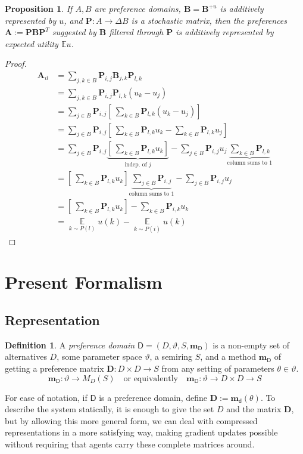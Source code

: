 \documentclass{article}
\theoremstyle{plain}
\newtheorem{prop}[theorem]{Proposition}
\theoremstyle{definition}
\newtheorem{defn}{Definition}[section]
\theoremstyle{remark}
\newcommand\mat[1]{\mathbf #1}
\newcommand\m[1]{\mathbf m_{\mathsf #1}}
\begin{document}
	\begin{prop}
		If $A, B$ are preference domains, $\mat B = \mat B^{+u}$ is additively represented by $u$, and $\mat P : A \to \Delta B$ is a stochastic matrix, then the preferences $\mat A := \mat P \mat B \mat P^T$ suggested by $\mat B$ filtered through $\mat P$ is additively represented by expected utility $\mathbb E u$.
	\end{prop}
	\begin{proof}
		\begin{align*}
			\mat A_{il} &= \sum_{j,k \in B} \mat P_{i,j} \mat B_{j,k} \mat P_{l,k} \\
				&= \sum_{j,k \in B} \mat P_{i,j}  \mat P_{l,k} (u_k - u_j) \\
				&= \sum_{j \in B} \mat P_{i,j} \left[ ~\sum_{k \in B} \mat P_{l,k} (u_k - u_j)\right]\\
				&= \sum_{j \in B} \mat P_{i,j} \left[ ~\sum_{k \in B} \mat P_{l,k} u_k - \sum_{k \in B} \mat P_{l,k} u_j \right] \\
				&= \sum_{j \in B} \mat P_{i,j} \underbrace{\left[ ~\sum_{k \in B} \mat P_{l,k} u_k  \right]}_{\text{indep. of $j$}} -  \sum_{j \in B} \mat P_{i,j} u_j \underbrace{\sum_{k \in B} \mat P_{l,k}}_{\text{column sums to 1}} \\
				&= \left[ ~\sum_{k \in B} \mat P_{l,k} u_k  \right] \underbrace{\sum_{j \in B} \mat P_{i,j}}_{\text{column sums to 1}} -  \sum_{j \in B} \mat P_{i,j} u_j \\
				&= \left[ ~\sum_{k \in B} \mat P_{l,k} u_k  \right]  -  \sum_{k \in B} \mat P_{i,k} u_k \\
				&= \mathop{\mathbb E}\limits_{k \sim P(l)} u(k) - \mathop{\mathbb E}\limits_{k \sim P(i)} u(k)
		\end{align*}
	\end{proof}

	\section{Present Formalism}
	\subsection{Representation}
	\begin{defn}
		A \emph{preference domain} $\mathsf D = (D, \vartheta, S, \m D)$ is a non-empty set of alternatives $D$, some parameter space $\vartheta$, a semiring $S$, and a method $\m D$ of getting a preference matrix $\mat D: D \times D \to S$ from any setting of parameters $\theta \in \vartheta$.
		\[ \m D: \vartheta \to M_D(S) \quad\text{or equivalently}\quad \m D : \vartheta \to D \times D \to S \]
		
		For ease of notation, if $\mathsf D$ is a preference domain, define $\mat D := \m d(\theta)$.
		To describe the system statically, it is enough to give the set $D$ and the matrix $\mat D$, but by allowing this more general form, we can deal with compressed representations in a more satisfying way, making gradient updates possible without requiring that agents carry these complete matrices around. 
	\end{defn}
	
\end{document}
